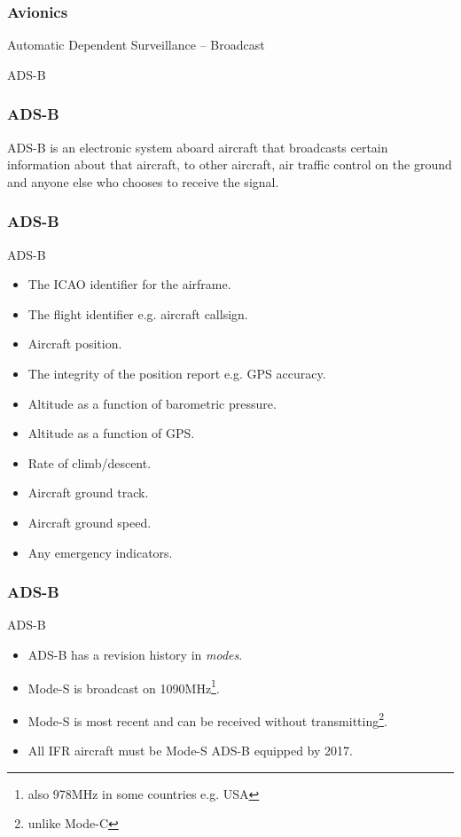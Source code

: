 \begin{frame}
\frametitle{Avionics}
\begin{center}
Automatic Dependent Surveillance -- Broadcast
\par
ADS-B
\end{center}
\end{frame}

\begin{frame}
\frametitle{ADS-B}
\begin{center}
ADS-B is an electronic system aboard aircraft that broadcasts certain information about that aircraft, to other aircraft, air traffic control on the ground and anyone else who chooses to receive the signal.
\end{center}
\end{frame}

\begin{frame}
\frametitle{ADS-B}
\begin{block}{ADS-B}
\begin{itemize}
\item<1-> The ICAO identifier for the airframe.
\item<2-> The flight identifier e.g. aircraft callsign.
\item<3-> Aircraft position.
\item<4-> The integrity of the position report e.g. GPS accuracy.
\item<5-> Altitude as a function of barometric pressure.
\item<6-> Altitude as a function of GPS.
\item<7-> Rate of climb/descent.
\item<8-> Aircraft ground track.
\item<9-> Aircraft ground speed.
\item<10-> Any emergency indicators.
\end{itemize}
\end{block}
\end{frame}

\begin{frame}
\frametitle{ADS-B}
\begin{block}{ADS-B}
\begin{itemize}
\item<1-> ADS-B has a revision history in \emph{modes}.
\item<2-> Mode-S is broadcast on 1090MHz\footnote{also 978MHz in some countries e.g. USA}.
\item<3-> Mode-S is most recent and can be received without transmitting\footnote{unlike Mode-C}.
\item<4-> All IFR aircraft must be Mode-S ADS-B equipped by 2017.
\end{itemize}
\end{block}
\end{frame}


